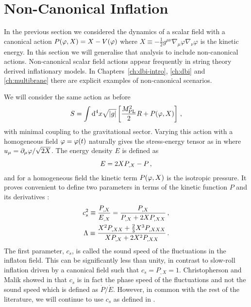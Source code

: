\section{Non-Canonical Inflation} 
\label{sec:noncanoninfl}

In the previous section we considered the dynamics of a scalar field with a
canonical action $P(\varphi, X) = X - V(\varphi)$ where $X \equiv -\frac{1}{2}g^{\mu
\nu}\nabla_\mu \varphi \nabla_\nu \varphi$ is the kinetic energy. 
In this
section we will generalise
that analysis to include non-canonical actions. Non-canonical scalar
field actions appear frequently in string theory derived inflationary models.
In Chapters~\ref{ch:dbi-intro}, \ref{ch:dbi} and \ref{ch:multibrane}
there are explicit examples of non-canonical scenarios.

We will consider the same action as before
% 
\begin{equation}
\label{eq:DBIaction-dbiintro2}
S=\int  \mathrm{d}^4x \sqrt{|g|} \left[ \frac{M_{\mathrm{PL}}^2}{2} R 
+ P (\varphi , X) \right] \,,
\end{equation}
% 
with minimal coupling to the gravitational sector. Varying this action with a
homogeneous field $\varphi=\varphi(t)$ naturally gives the stress-energy tensor as in
 where $u_\mu = \partial_\mu\varphi/\sqrt{2X}$. 
The energy density $E$ is defined as
\begin{equation}
 E = 2XP_{,X} - P\,,
\end{equation}
% 
and for a homogeneous field the kinetic term $P(\varphi, X)$ is the
isotropic pressure. 
It proves convenient to define two parameters in terms of the 
kinetic function $P$ and its derivatives \cite{lidser1,lidser3}: 
% 
\begin{eqnarray}
\label{eq:defcs-dbiintro}
 c_s^2 \equiv \frac{P_{,X}}{E_{,X}} =  \frac{P_{,X}}{P_{,X} + 2X P_{,XX}} \,,
\\
\label{eq:deflambda-dbiintro}
\Lambda \equiv  \frac{X^2 P_{,XX} +
\frac{2}{3}X^3 P_{,XXX}}{X P_{,X} +
2X^2 P_{,XX}}\,.
\end{eqnarray}
% 
The first parameter, $c_s$, is called the sound speed of the fluctuations
in the inflaton field. This can be significantly less than unity, 
in contrast to slow-roll inflation driven by a canonical 
field such that $c_s = P_{,X} =1$.
% 
Christopherson and Malik showed in  that $c_s$
is in fact the phase speed of the fluctuations and not the sound speed
which is defined as $\dot{P}/\dot{E}$. However, in common with the rest of the
literature, we will continue to use $c_s$ as defined in . 

